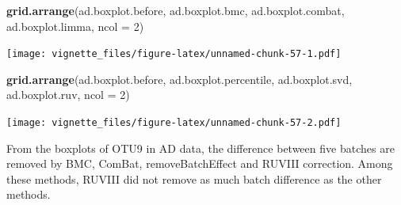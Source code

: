 \documentclass[]{book}
\newenvironment{Shaded}{\begin{snugshade}}{\end{snugshade}}
\newcommand{\KeywordTok}[1]{\textcolor[rgb]{0.13,0.29,0.53}{\textbf{#1}}}
\newcommand{\DataTypeTok}[1]{\textcolor[rgb]{0.13,0.29,0.53}{#1}}
\newcommand{\DecValTok}[1]{\textcolor[rgb]{0.00,0.00,0.81}{#1}}
\newcommand{\StringTok}[1]{\textcolor[rgb]{0.31,0.60,0.02}{#1}}
\newcommand{\OperatorTok}[1]{\textcolor[rgb]{0.81,0.36,0.00}{\textbf{#1}}}
\newcommand{\NormalTok}[1]{#1}
\begin{document}
\begin{Shaded}
\end{Shaded}

\begin{Shaded}
\begin{Highlighting}[]
\KeywordTok{grid.arrange}\NormalTok{(ad.boxplot.before, ad.boxplot.bmc, }
\NormalTok{             ad.boxplot.combat, ad.boxplot.limma, }\DataTypeTok{ncol =} \DecValTok{2}\NormalTok{)}
\end{Highlighting}
\end{Shaded}

\texttt{[image: vignette\_files/figure-latex/unnamed-chunk-57-1.pdf]}

\begin{Shaded}
\begin{Highlighting}[]
\KeywordTok{grid.arrange}\NormalTok{(ad.boxplot.before, ad.boxplot.percentile, }
\NormalTok{             ad.boxplot.svd, ad.boxplot.ruv, }\DataTypeTok{ncol =} \DecValTok{2}\NormalTok{)}
\end{Highlighting}
\end{Shaded}

\texttt{[image: vignette\_files/figure-latex/unnamed-chunk-57-2.pdf]}

From the boxplots of OTU9 in AD data, the difference between five
batches are removed by BMC, ComBat, removeBatchEffect and RUVIII
correction. Among these methods, RUVIII did not remove as much batch
difference as the other methods.
\end{document}
